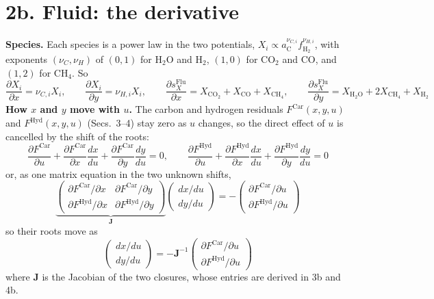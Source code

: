 \documentclass[11pt]{article}
\newcommand{\fHt}{f_{\mathrm{H_2}}}
\newcommand{\aC}{a_{\mathrm{C}}}
\begin{document}
\section*{2b. Fluid: the derivative}
\vspace*{\fill}
{\small\setlength{\abovedisplayskip}{13pt}\setlength{\belowdisplayskip}{13pt}\setlength{\abovedisplayshortskip}{13pt}\setlength{\belowdisplayshortskip}{13pt}
\textbf{Species.} Each species is a power law in the two potentials, $X_i\propto\aC^{\nu_{C,i}}\fHt^{\nu_{H,i}}$, with exponents $(\nu_C,\nu_H)$ of $(0,1)$ for H$_2$O and H$_2$, $(1,0)$ for CO$_2$ and CO, and $(1,2)$ for CH$_4$. So
\begin{equation}
  \frac{\partial X_i}{\partial x}=\nu_{C,i}X_i,\qquad \frac{\partial X_i}{\partial y}=\nu_{H,i}X_i,\qquad
  \frac{\partial s_X^{\mathrm{Flu}}}{\partial x}=X_{\mathrm{CO_2}}+X_{\mathrm{CO}}+X_{\mathrm{CH_4}},\qquad
  \frac{\partial s_X^{\mathrm{Flu}}}{\partial y}=X_{\mathrm{H_2O}}+2X_{\mathrm{CH_4}}+X_{\mathrm{H_2}}
\end{equation}
\textbf{How $x$ and $y$ move with $u$.} The carbon and hydrogen residuals $F^{\mathrm{Car}}(x,y,u)$ and $F^{\mathrm{Hyd}}(x,y,u)$ (Secs.~3--4) stay zero as $u$ changes, so the direct effect of $u$ is cancelled by the shift of the roots:
\begin{equation}
  \frac{\partial F^{\mathrm{Car}}}{\partial u}+\frac{\partial F^{\mathrm{Car}}}{\partial x}\frac{dx}{du}+\frac{\partial F^{\mathrm{Car}}}{\partial y}\frac{dy}{du}=0,\qquad
  \frac{\partial F^{\mathrm{Hyd}}}{\partial u}+\frac{\partial F^{\mathrm{Hyd}}}{\partial x}\frac{dx}{du}+\frac{\partial F^{\mathrm{Hyd}}}{\partial y}\frac{dy}{du}=0
\end{equation}
or, as one matrix equation in the two unknown shifts,
\begin{equation}
  \underbrace{\begin{pmatrix}\partial F^{\mathrm{Car}}/\partial x & \partial F^{\mathrm{Car}}/\partial y\\[2pt] \partial F^{\mathrm{Hyd}}/\partial x & \partial F^{\mathrm{Hyd}}/\partial y\end{pmatrix}}_{\mathbf J}
  \begin{pmatrix}dx/du\\[2pt] dy/du\end{pmatrix}=-\begin{pmatrix}\partial F^{\mathrm{Car}}/\partial u\\[2pt] \partial F^{\mathrm{Hyd}}/\partial u\end{pmatrix}
\end{equation}
so their roots move as
\begin{equation}
  \begin{pmatrix}dx/du\\ dy/du\end{pmatrix}=-\mathbf J^{-1}\begin{pmatrix}\partial F^{\mathrm{Car}}/\partial u\\ \partial F^{\mathrm{Hyd}}/\partial u\end{pmatrix}
\end{equation}
where $\mathbf J$ is the Jacobian of the two closures, whose entries are derived in 3b and 4b.

}
\end{document}
